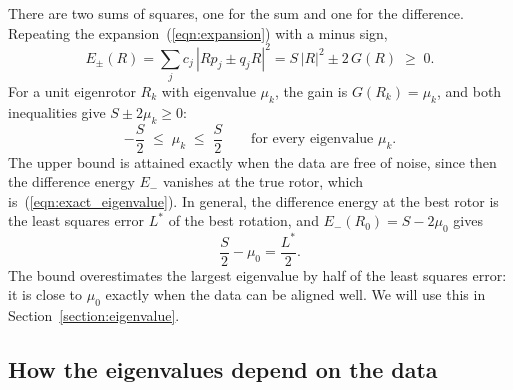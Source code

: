 \documentclass{birkjour}
\theoremstyle{definition}
\theoremstyle{remark}
\numberwithin{equation}{section}
\begin{document}
There are two sums of squares, one for the sum and one for the difference. Repeating the expansion~(\ref{eqn:expansion}) with a minus sign,
\begin{equation}
\label{eqn:two_energies}
E_\pm(R) = \sum_j c_j\, |R p_j \pm q_j R|^2 = S\, |R|^2 \pm 2\, G(R) \;\geq\; 0.
\end{equation}
For a unit eigenrotor $R_k$ with eigenvalue $\mu_k$, the gain is $G(R_k) = \mu_k$, and both inequalities give $S \pm 2 \mu_k \geq 0$:
\begin{equation}
\label{eqn:bounds}
-\frac{S}{2} \;\leq\; \mu_k \;\leq\; \frac{S}{2} \qquad \text{for every eigenvalue } \mu_k.
\end{equation}
The upper bound is attained exactly when the data are free of noise, since then the difference energy $E_-$ vanishes at the true rotor, which is~(\ref{eqn:exact_eigenvalue}). In general, the difference energy at the best rotor is the least squares error $L^*$ of the best rotation, and $E_-(R_0) = S - 2 \mu_0$ gives
\begin{equation}
\label{eqn:overshoot}
\frac{S}{2} - \mu_0 = \frac{L^*}{2}.
\end{equation}
The bound overestimates the largest eigenvalue by half of the least squares error: it is close to $\mu_0$ exactly when the data can be aligned well. We will use this in Section~\ref{section:eigenvalue}.

\subsection{How the eigenvalues depend on the data}
\end{document}
